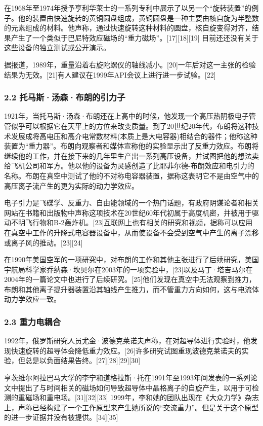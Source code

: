 在1968年至1974年授予亨利华莱士的一系列专利中展示了以另一个“旋转装置”的例子。他的装置由快速旋转的黄铜圆盘组成，黄铜圆盘是一种主要由核自旋为半整数的元素组成的材料。他声称，通过快速旋转这种材料的圆盘，核自旋变得对齐，结果产生了一个类似于巴尼特效应磁场的“重力磁场”。[17][18][19] 目前还还没有关于这些设备的独立测试或公开演示。

据报道，1989年，重量沿着右旋陀螺仪的轴线减小。[20]一年后对这一主张的检验结果为无效。[21]有人建议在1999年API会议上进行进一步试验。[22]
\subsubsection{2.2 托马斯·汤森·布朗的引力子}
1921年，当托马斯·汤森·布朗还在上高中的时候，他发现一个高压热阴极电子管管似乎可以根据它在天平上的方位来改变质量。到了20世纪20年代，布朗将这种技术发展成将高电压和高介电常数材料(本质上是大电容器)相结合的器件；他称这种装置为“重力器”。布朗向观察者和媒体宣称他的实验显示出了反重力效应。布朗将继续他的工作，并在接下来的几年里生产出一系列高压设备，并试图把他的想法卖给飞机公司和军方。他以他的设备为灵感创造了比耶菲尔德-布朗效应和电引力的名称。布朗在真空中测试了他的不对称电容器装置，据称这表明它不是由空气中的高压离子流产生的更为实际的动力学效应。

电子引力是飞碟学、反重力、自由能领域的一个热门话题，有政府阴谋论者和相关网站在书籍和出版物中声称这项技术在20世纪60年代初属于高度机密，并被用于驱动不明飞行物和B-2轰炸机。[23]互联网上也有相关的研究和视频，据称可以应用在真空中工作的升降式电容器设备中，从而使设备不会受到空气中产生的离子漂移或离子风的推动。[23][24]

在1990年美国空军的一项研究中，对布朗的工作和其他主张进行了后续研究，美国宇航局科学家乔纳森·坎贝尔在2003年的一项实验中，[23]以及马丁·塔吉马尔在2004年的一篇论文中也进行了后续研究。[25]他们发现在真空中无法观察到推力，布朗和其他离子提升器装置沿其轴线产生推力，而不管重力方向如何，这与电流体动力学效应一致。
\subsubsection{2.3 重力电耦合}
1992年，俄罗斯研究人员尤金·波德克莱诺夫声称，在对超导体进行实验时，他发现快速旋转的超导体会降低重力效应。[26]许多研究试图重现波德克莱诺夫的实验，但总是以负面结果告终。[27][28][29][30]

亨茨维尔阿拉巴马大学的李宁和道格拉斯·托在1991年至1993年间发表的一系列论文中提出了与时间相关的磁场如何导致超导体中晶格离子的自旋产生，以用于可检测的重磁场和重电场。[31][32][33] 1999年，李和她的团队出现在《大众力学》杂志上，声称已经构建了一个工作原型来产生她所说的“交流重力”。但是关于这个原型的进一步证据并没有被提供。[34][35]

